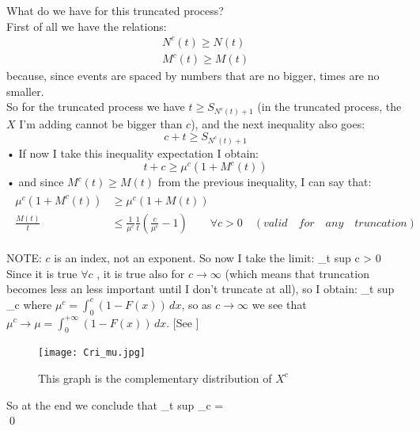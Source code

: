 	What do we have for this truncated process?\\
	First of all we have the relations:
	\begin{equation}
	\begin{split}
	N^c(t) \geq N(t)\\
	M^c(t) \geq M(t)
	\end{split}
	\end{equation}
	because, since events are spaced by numbers that are no bigger, times are no smaller.\\

	So for the truncated process we have $t \geq S_{N^c(t) +1}$ (in the truncated process, the $X$ I'm adding cannot be bigger than $c$), and the next inequality also goes:
	\begin{equation}
	c+t \geq S_{N^c(t)+1}
	\end{equation}•
	If now I take this inequality expectation I obtain:
	\begin{equation}
	t+c \geq \mu^c(1+M^c(t))
	\end{equation}•
	and since $M^c(t) \geq M(t)$ from the previous inequality, I can say that:
	\begin{align}
	\begin{split}
	\mu^c(1+M^c(t)) &\geq \mu^c(1+M(t))\\
	\frac{M(t)}{t} &\leq \frac{1}{\mu^c} \frac{1}{t}(\frac{c}{\mu^c}-1) \qquad \forall c > 0 \quad (valid\quad for\quad any\quad truncation)
	\end{split}
	\end{align}

	NOTE: $c$ is an index, not an exponent.
	So now I take the limit:
	\beq
	\lim_{t \to \infty} sup  \leq {} \qquad \forall c > 0
	\eeq
	Since it is true $\forall c$ , it is true also for $c \to \infty$ (which means that truncation becomes less an less important until I don't truncate at all), so I obtain:
	\beq
	\lim_{t \to \infty} sup  \leq \lim_{c \to \infty} 
	\eeq
	where $\mu^c = \int_0^c(1-F(x))\,dx$, so as $c \to \infty$ we see that $\mu^c \to \mu = \int_0^{+\infty}(1-F(x))\,dx$. [See ]
	\begin{figure}
	\centering
	\texttt{[image: Cri\_mu.jpg]}
	\caption{This graph is the complementary distribution of $X^c$}
	\label{fig:mu}
	\end{figure}
	So at the end we conclude that
	\beq
	\lim_{t \to \infty} sup  \leq \lim_{c \to \infty}  = 
	\eeq
	\\
	\qed
